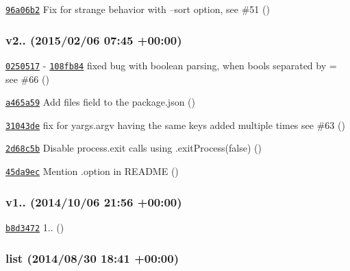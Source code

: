 \begin{DoxyItemize}
\item \href{https://github.com/bcoe/yargs/commit/96a06b2650ff1d085a52b7328d8bba614c20cc12}{\tt 96a06b2} Fix for strange behavior with --sort option, see \#51 ()
\end{DoxyItemize}

\subsubsection*{v2.. (2015/02/06 07\+:45 +00\+:00)}


\begin{DoxyItemize}
\item \href{https://github.com/bcoe/yargs/commit/0250517c9643e53f431b824e8ccfa54937414011}{\tt 0250517} -\/ \href{https://github.com/bcoe/yargs/commit/108fb8409a3a63dcaf99d917fe4dfcfaa1de236d}{\tt 108fb84} fixed bug with boolean parsing, when bools separated by = see \#66 ()
\item \href{https://github.com/bcoe/yargs/commit/a465a5915f912715738de890982e4f8395958b10}{\tt a465a59} Add {\ttfamily files} field to the package.\+json ()
\item \href{https://github.com/bcoe/yargs/commit/31043de7a38a17c4c97711f1099f5fb164334db3}{\tt 31043de} fix for yargs.\+argv having the same keys added multiple times see \#63 ()
\item \href{https://github.com/bcoe/yargs/commit/2d68c5b91c976431001c4863ce47c9297850f1ad}{\tt 2d68c5b} Disable process.\+exit calls using .exit\+Process(false) ()
\item \href{https://github.com/bcoe/yargs/commit/45da9ec4c55a7bd394721bc6a1db0dabad7bc52a}{\tt 45da9ec} Mention .option in R\+E\+A\+D\+ME ()
\end{DoxyItemize}

\subsubsection*{v1.. (2014/10/06 21\+:56 +00\+:00)}


\begin{DoxyItemize}
\item \href{https://github.com/bcoe/yargs/commit/b8d34725482e5821a3cc809c0df71378f282f526}{\tt b8d3472} 1.. ()
\end{DoxyItemize}

\subsubsection*{list (2014/08/30 18\+:41 +00\+:00)}


